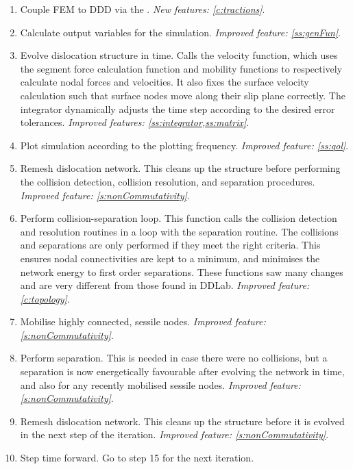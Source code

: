 \begin{center}
\begin{enumerate}
    \item Couple FEM to DDD via the . \emph{New features: \cref{c:tractions}}.
    \item Calculate output variables for the simulation. \emph{Improved feature: \cref{ss:genFun}}.
    \item Evolve dislocation structure in time. Calls the velocity function, which uses the segment force calculation function and mobility functions to respectively calculate nodal forces and velocities. It also fixes the surface velocity calculation such that surface nodes move along their slip plane correctly. The integrator dynamically adjusts the time step according to the desired error tolerances. \emph{Improved features: \cref{ss:integrator,ss:matrix}}.
    \item Plot simulation according to the plotting frequency. \emph{Improved feature: \cref{ss:qol}}.
    \item Remesh dislocation network. This cleans up the structure before performing the collision detection, collision resolution, and separation procedures. \emph{Improved feature: \cref{s:nonCommutativity}}.
    \item Perform collision-separation loop. This function calls the collision detection and resolution routines in a loop with the separation routine. The collisions and separations are only performed if they meet the right criteria. This ensures nodal connectivities are kept to a minimum, and minimises the network energy to first order separations. These functions saw many changes and are very different from those found in DDLab. \emph{Improved feature: \cref{c:topology}}.
    \item Mobilise highly connected, sessile nodes. \emph{Improved feature: \cref{s:nonCommutativity}}.
    \item Perform separation. This is needed in case there were no collisions, but a separation is now energetically favourable after evolving the network in time, and also for any recently mobilised sessile nodes.  \emph{Improved feature: \cref{s:nonCommutativity}}.
    \item Remesh dislocation network. This cleans up the structure before it is evolved in the next step of the iteration.  \emph{Improved feature: \cref{s:nonCommutativity}}.
    \item Step time forward. Go to step 15 for the next iteration.
  \end{enumerate}
\end{center}

